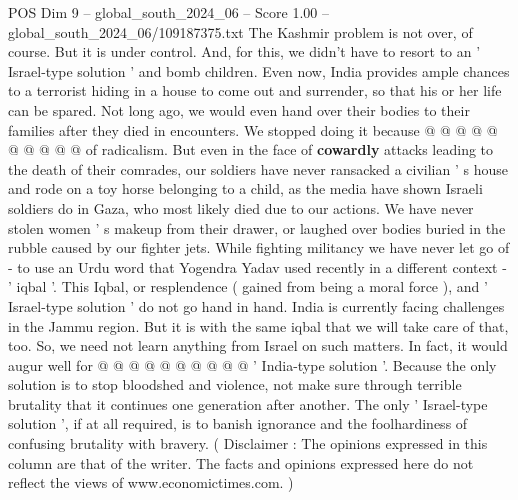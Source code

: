 \begin{textsample}{POS Dim 9 – global\_south\_2024\_06 – Score 1.00 – global\_south\_2024\_06/109187375.txt}
The Kashmir problem is not over, of course.
But it is under control.
And, for this, we didn't have to resort to an ' Israel-type solution ' and bomb children.
Even now, India provides ample chances to a terrorist hiding in a house to come out and surrender, so that his or her life can be spared.
Not long ago, we would even hand over their bodies to their families after they died in encounters.
We stopped doing it because @ @ @ @ @ @ @ @ @ @ of radicalism.
But even in the face of \textbf{cowardly} attacks leading to the death of their comrades, our soldiers have never ransacked a civilian ' s house and rode on a toy horse belonging to a child, as the media have shown Israeli soldiers do in Gaza, who most likely died due to our actions.
We have never stolen women ' s makeup from their drawer, or laughed over bodies buried in the rubble caused by our fighter jets.
While fighting militancy we have never let go of - to use an Urdu word that Yogendra Yadav used recently in a different context - ' iqbal '.
This Iqbal, or resplendence ( gained from being a moral force ), and ' Israel-type solution ' do not go hand in hand.
India is currently facing challenges in the Jammu region.
But it is with the same iqbal that we will take care of that, too.
So, we need not learn anything from Israel on such matters.
In fact, it would augur well for @ @ @ @ @ @ @ @ @ @ ' India-type solution '.
Because the only solution is to stop bloodshed and violence, not make sure through terrible brutality that it continues one generation after another.
The only ' Israel-type solution ', if at all required, is to banish ignorance and the foolhardiness of confusing brutality with bravery. ( Disclaimer : The opinions expressed in this column are that of the writer.
The facts and opinions expressed here do not reflect the views of www.economictimes.com. )

\end{textsample}
